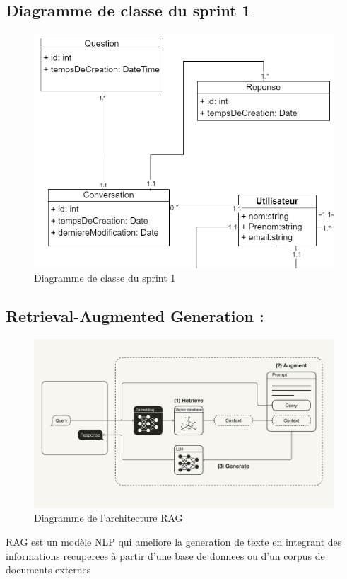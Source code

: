 \documentclass[a4paper, 11pt, openany]{report}
\begin{document}
\subsection{Diagramme de classe du sprint 1}
\begin{figure}[H]
\centering
\includegraphics[width=\textwidth]{sprint1-class.png}
\caption{Diagramme de classe du sprint 1}
\label{fig:sprint1_class}
\end{figure}

\subsection{Retrieval-Augmented Generation :}
\clearpage
\begin{figure}[H]
\centering
\includegraphics[width=\textwidth]{images/rag.png} 
\caption{Diagramme de l'architecture RAG}
\label{fig:rag}
\end{figure}
RAG est un modèle NLP qui ameliore la generation de texte en integrant des informations recuperees à partir d'une base de donnees ou d'un corpus de documents externes
\end{document}
